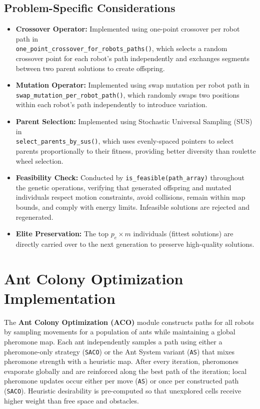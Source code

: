\subsection{Problem-Specific Considerations}
\begin{itemize}
    \item \textbf{Crossover Operator:} Implemented using one-point crossover per robot path in \\ \texttt{one\_point\_crossover\_for\_robots\_paths()}, which selects a random crossover point for each robot's path independently and exchanges segments between two parent solutions to create offspring.
    \item \textbf{Mutation Operator:} Implemented using swap mutation per robot path in \\ \texttt{swap\_mutation\_per\_robot\_path()}, which randomly swaps two positions within each robot's path independently to introduce variation.
    \item \textbf{Parent Selection:} Implemented using Stochastic Universal Sampling (SUS) in \\ \texttt{select\_parents\_by\_sus()}, which uses evenly-spaced pointers to select parents proportionally to their fitness, providing better diversity than roulette wheel selection.
    \item \textbf{Feasibility Check:} Conducted by \texttt{is\_feasible(path\_array)} throughout the genetic operations, verifying that generated offspring and mutated individuals respect motion constraints, avoid collisions, remain within map bounds, and comply with energy limits. Infeasible solutions are rejected and regenerated.
    \item \textbf{Elite Preservation:} The top $p_e \times m$ individuals (fittest solutions) are directly carried over to the next generation to preserve high-quality solutions.
\end{itemize}

\section{Ant Colony Optimization Implementation}

The \textbf{Ant Colony Optimization (ACO)} module constructs paths for all robots by sampling movements for a population of ants while maintaining a global pheromone map. Each ant independently samples a path using either a pheromone-only strategy (\texttt{SACO}) or the Ant System variant (\texttt{AS}) that mixes pheromone strength with a heuristic map. After every iteration, pheromones evaporate globally and are reinforced along the best path of the iteration; local pheromone updates occur either per move (\texttt{AS}) or once per constructed path (\texttt{SACO}). Heuristic desirability is pre-computed so that unexplored cells receive higher weight than free space and obstacles.

